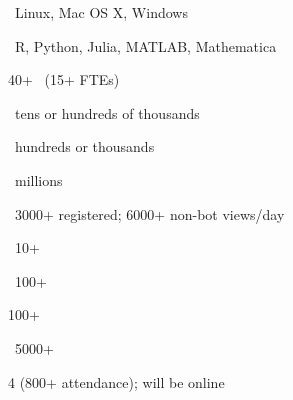 \documentclass[10pt]{report}
\begin{document}
{
\begin{subitemize}
\item {} \ Linux, Mac OS X, Windows
\vspace*{-4pt}
\item {} \ R, Python, Julia, MATLAB, Mathematica
\vspace*{-4pt}
\item {} 40+ \ {\small (15+ FTEs)}
\vspace*{-4pt}
\item {}\ tens or hundreds of thousands
\vspace*{-4pt}
\item {} \ hundreds or thousands
\vspace*{-4pt}
\item {}\ millions
\vspace*{-4pt}
\item {} \ 3000+ registered; 6000+ non-bot views/day
\vspace*{-4pt}
\item {} \ 10+
\vspace*{-4pt}
\item {} \ 100+
\vspace*{-4pt}
\item {} 100+
\vspace*{-4pt}
\item {} \ 5000+
\vspace*{-4pt}
\item {} 4 (800+ attendance);   will be online
\end{subitemize}

}
\end{document}
